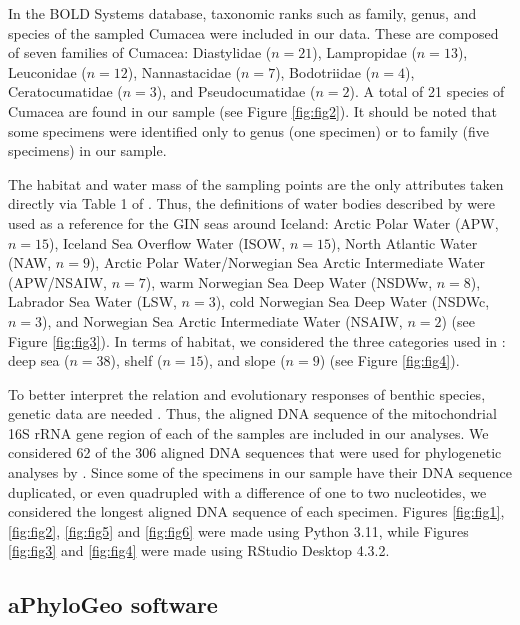 In the BOLD Systems database, taxonomic ranks such as family, genus, and species of the sampled Cumacea were included in our data. These are composed of seven families of Cumacea: Diastylidae ($n=21$), Lampropidae ($n=13$), Leuconidae ($n=12$), Nannastacidae ($n=7$), Bodotriidae ($n=4$), Ceratocumatidae ($n=3$), and Pseudocumatidae ($n=2$). A total of 21 species of Cumacea are found in our sample (see Figure \ref{fig:fig2}). It should be noted that some specimens were identified only to genus (one specimen) or to family (five specimens) in our sample.

The habitat and water mass of the sampling points are the only attributes taken directly via Table 1 of \citep{uhlir_adding_2021}. Thus, the definitions of water bodies described by \citep{hansen_north_2000, brix2010distribution, ostmann_marine_2014} were used as a reference for the GIN seas around Iceland: Arctic Polar Water (APW, $n=15$), Iceland Sea Overflow Water (ISOW, $n=15$), North Atlantic Water (NAW, $n=9$), Arctic Polar Water/Norwegian Sea Arctic Intermediate Water (APW/NSAIW, $n=7$), warm Norwegian Sea Deep Water (NSDWw, $n=8$), Labrador Sea Water (LSW, $n=3$), cold Norwegian Sea Deep Water (NSDWc, $n=3$), and Norwegian Sea Arctic Intermediate Water (NSAIW, $n=2$) (see Figure \ref{fig:fig3}). In terms of habitat, we considered the three categories used in \citep{uhlir_adding_2021}: deep sea ($n=38$), shelf ($n=15$), and slope ($n=9$) (see Figure \ref{fig:fig4}).

To better interpret the relation and evolutionary responses of benthic species, genetic data are needed \citep{wilson_speciation_1987, uhlir_adding_2021}. Thus, the aligned DNA sequence of the mitochondrial 16S rRNA gene region of each of the samples are included in our analyses. We considered 62 of the 306 aligned DNA sequences that were used for phylogenetic analyses by \citep{uhlir_adding_2021}. Since some of the specimens in our sample have their DNA sequence duplicated, or even quadrupled with a difference of one to two nucleotides, we considered the longest aligned DNA sequence of each specimen. Figures \ref{fig:fig1}, \ref{fig:fig2}, \ref{fig:fig5} and \ref{fig:fig6} were made using Python 3.11, while Figures \ref{fig:fig3} and \ref{fig:fig4} were made using RStudio Desktop 4.3.2.

\subsection{aPhyloGeo software}

